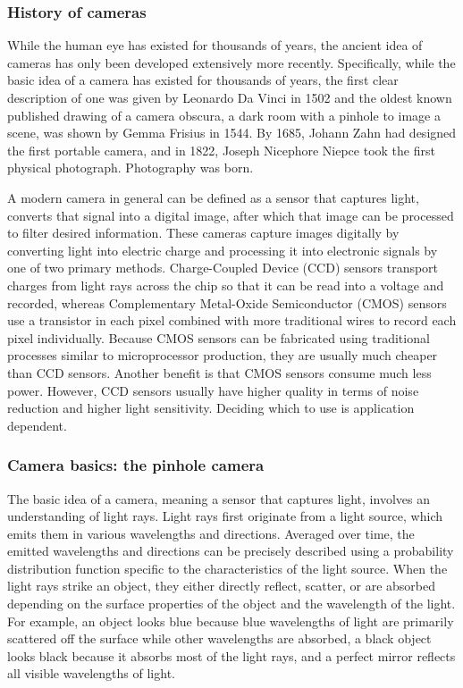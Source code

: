 \subsubsection{History of cameras}

While the human eye has existed for thousands of years, the ancient idea of cameras has only been developed extensively more recently. Specifically, while the basic idea of a camera has existed for thousands of years, the first clear description of one was given by Leonardo Da Vinci in 1502 and the oldest known published drawing of a camera obscura, a dark room with a pinhole to image a scene, was shown by Gemma Frisius in 1544. By 1685, Johann Zahn had designed the first portable camera, and in 1822, Joseph Nicephore Niepce took the first physical photograph. Photography was born.

A modern camera in general can be defined as a sensor that captures light, converts that signal into a digital image, after which that image can be processed to filter desired information. These cameras capture images digitally by converting light into electric charge and processing it into electronic signals by one of two primary methods. Charge-Coupled Device (CCD) sensors transport charges from light rays across the chip so that it can be read into a voltage and recorded, whereas Complementary Metal-Oxide Semiconductor (CMOS) sensors use a transistor in each pixel combined with more traditional wires to record each pixel individually. Because CMOS sensors can be fabricated using traditional processes similar to microprocessor production, they are usually much cheaper than CCD sensors. Another benefit is that CMOS sensors consume much less power. However, CCD sensors usually have higher quality in terms of noise reduction and higher light sensitivity. Deciding which to use is application dependent.

\subsubsection{Camera basics: the pinhole camera}

The basic idea of a camera, meaning a sensor that captures light, involves an understanding of light rays. Light rays first originate from a light source, which emits them in various wavelengths and directions. Averaged over time, the emitted wavelengths and directions can be precisely described using a probability distribution function specific to the characteristics of the light source. When the light rays strike an object, they either directly reflect, scatter, or are absorbed depending on the surface properties of the object and the wavelength of the light. For example, an object looks blue because blue wavelengths of light are primarily scattered off the surface while other wavelengths are absorbed, a black object looks black because it absorbs most of the light rays, and a perfect mirror reflects all visible wavelengths of light.

